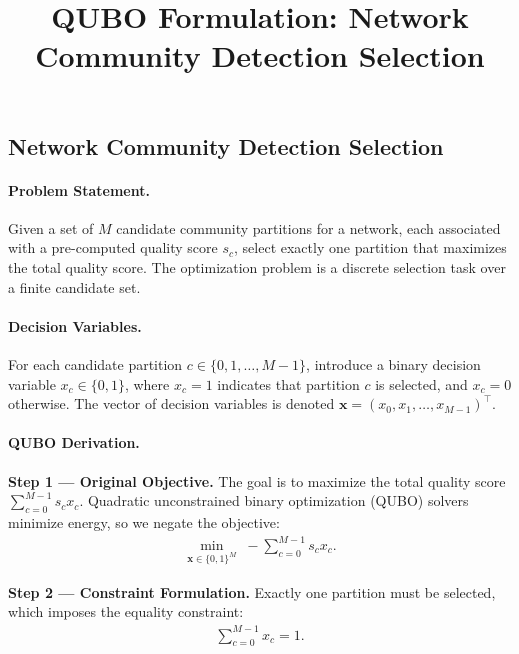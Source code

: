 \documentclass[12pt]{article}
\title{QUBO Formulation: Network Community Detection Selection}
\date{}
\begin{document}
\maketitle

\subsection*{Network Community Detection Selection}

\paragraph{Problem Statement.}
Given a set of $M$ candidate community partitions for a network, each associated with a pre-computed quality score $s_c$, select exactly one partition that maximizes the total quality score. The optimization problem is a discrete selection task over a finite candidate set.

\paragraph{Decision Variables.}
For each candidate partition $c \in \{0, 1, \dots, M-1\}$, introduce a binary decision variable $x_c \in \{0, 1\}$, where $x_c = 1$ indicates that partition $c$ is selected, and $x_c = 0$ otherwise. The vector of decision variables is denoted $\mathbf{x} = (x_0, x_1, \dots, x_{M-1})^\top$.

\paragraph{QUBO Derivation.}
\textbf{Step 1 --- Original Objective.} The goal is to maximize the total quality score $\sum_{c=0}^{M-1} s_c x_c$. Quadratic unconstrained binary optimization (QUBO) solvers minimize energy, so we negate the objective:
\begin{align}
\min_{\mathbf{x} \in \{0,1\}^M} \; -\sum_{c=0}^{M-1} s_c x_c.
\end{align}

\textbf{Step 2 --- Constraint Formulation.} Exactly one partition must be selected, which imposes the equality constraint:
\begin{align}
\sum_{c=0}^{M-1} x_c = 1.
\end{align}
\end{document}
